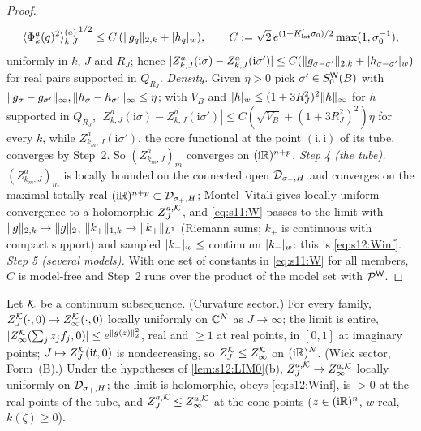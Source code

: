 \begin{proof}
\[
{\langle \Phi^a_k(q)^2\rangle^{(a)}_{k,J}}^{1/2}\le C\,(\lVert g_q\rVert_{2,k}+\lvert h_q\rvert_{w}),\qquad C:=\sqrt2\,e^{(1+K'_{\mathrm{lat}}\sigma_0)/2}\max(1,\sigma_0^{-1}),
\]
uniformly in $k$, $J$ and $R_J$; hence $|Z^a_{k,J}(\mathrm i\sigma)-Z^a_{k,J}(\mathrm i\sigma')|\le C(\lVert g_{\sigma-\sigma'}\rVert_{2,k}+\lvert h_{\sigma-\sigma'}\rvert_{w})$ for real pairs supported in $Q_{R_J}$. \emph{Density.} Given $\eta>0$ pick $\sigma'\in S^{\mathsf W}_0(B)$ with $\lVert g_\sigma-g_{\sigma'}\rVert_\infty,\lVert h_\sigma-h_{\sigma'}\rVert_\infty\le\eta$; with $V_B$ and $\lvert h\rvert_{w}\le(1+3R_J^2)^2\lVert h\rVert_\infty$ for $h$ supported in $Q_{R_J}$, $|Z^a_{k,J}(\mathrm i\sigma)-Z^a_{k,J}(\mathrm i\sigma')|\le C(\sqrt{V_B}+(1+3R_J^2)^2)\eta$ for every $k$, while $Z^a_{k_m,J}(\mathrm i\sigma')$, the core functional at the point $(\mathrm i,\mathrm i)$ of its tube, converges by Step~2. So $(Z^a_{k_m,J})_m$ converges on $(\mathrm i\mathbb R)^{n+p}$.
\emph{Step 4 (the tube).} $(Z^a_{k_m,J})_m$ is locally bounded on the connected open $\mathcal D_{\sigma_+,H}$ and converges on the maximal totally real $(\mathrm i\mathbb R)^{n+p}\subset\mathcal D_{\sigma_+,H}$; Montel--Vitali gives locally uniform convergence to a holomorphic $Z^{a,\mathcal K}_J$, and \eqref{eq:s11:W} passes to the limit with $\lVert g\rVert_{2,k}\to\lVert g\rVert_2$, $\lVert k_+\rVert_{1,k}\to\lVert k_+\rVert_{L^1}$ (Riemann sums; $k_+$ is continuous with compact support) and sampled $\lvert k_-\rvert_{w}\le$ continuum $\lvert k_-\rvert_{w}$: this is \eqref{eq:s12:Winf}.
\emph{Step 5 (several models).} With one set of constants in \eqref{eq:s11:W} for all members, $C$ is model-free and Step~2 runs over the product of the model set with $\mathcal{P}^{\mathsf W}$.
\end{proof}

\begin{lemma}\label{lem:s12:LIM1}
Let $\mathcal K$ be a continuum subsequence. \textup{(Curvature sector.)} For every family, $Z^{\mathcal K}_J(\cdot,0)\to Z^{\mathcal K}_{\infty}(\cdot,0)$ locally uniformly on $\mathbb C^N$ as $J\to\infty$; the limit is entire, $|Z^{\mathcal K}_{\infty}(\sum_jz_jf_j,0)|\le e^{\lVert g(z)\rVert_2^2}$, real and $\ge1$ at real points, in $[0,1]$ at imaginary points; $J\mapsto Z^{\mathcal K}_J(\mathrm it,0)$ is nondecreasing, so $Z^{\mathcal K}_J\le Z^{\mathcal K}_{\infty}$ on $(\mathrm i\mathbb R)^N$. \textup{(Wick sector, Form~(B).)} Under the hypotheses of \cref{lem:s12:LIM0}(b), $Z^{a,\mathcal K}_J\to Z^{a,\mathcal K}_\infty$ locally uniformly on $\mathcal D_{\sigma_+,H}$; the limit is holomorphic, obeys \eqref{eq:s12:Winf}, is $>0$ at the real points of the tube, and $Z^{a,\mathcal K}_J\le Z^{a,\mathcal K}_\infty$ at the cone points ($z\in(\mathrm i\mathbb R)^n$, $w$ real, $k(\zeta)\ge0$).
\end{lemma}

